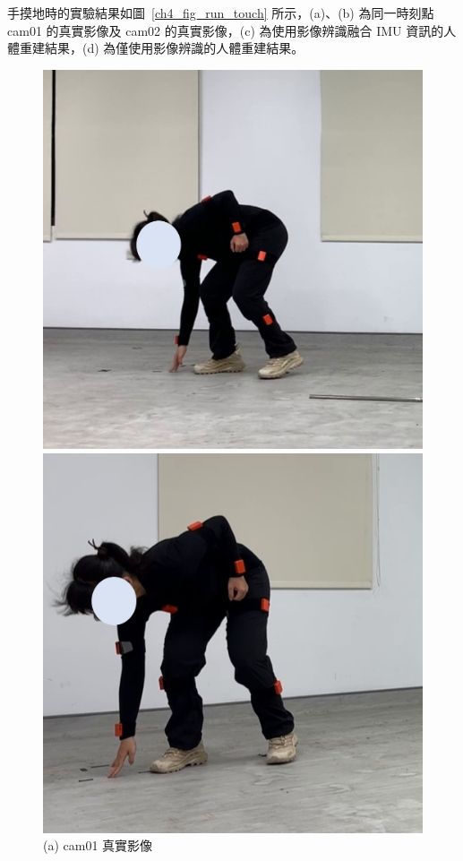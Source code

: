 \clearpage

手摸地時的實驗結果如圖~\ref{ch4_fig_run_touch} 所示，(a)、(b) 為同一時刻點 cam01 的真實影像及 cam02 的真實影像，(c) 為使用影像辨識融合 IMU 資訊的人體重建結果，(d) 為僅使用影像辨識的人體重建結果。

\begin{figure}[!ht]
   \centering
   \begin{minipage}{.5\textwidth}
      \centering
      \includegraphics[width=.95\linewidth]{figure/ch4_fig_run_cam01_with3.jpg}
      \caption*{(a) cam01 真實影像}
    \end{minipage}%
    \begin{minipage}{.5\textwidth}
       \centering
       \includegraphics[width=.95\linewidth]{figure/ch4_fig_run_cam02_with3.jpg}

\end{minipage}
\end{figure}
